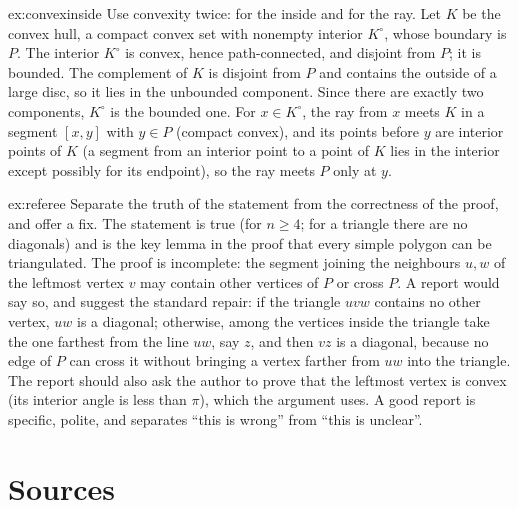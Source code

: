 \begin{solution}{ex:convexinside}
\idea Use convexity twice: for the inside and for the ray.
\writeup Let $K$ be the convex hull, a compact convex set with nonempty interior $K^\circ$, whose boundary is $P$. The interior $K^\circ$ is convex, hence path-connected, and disjoint from $P$; it is bounded. The complement of $K$ is disjoint from $P$ and contains the outside of a large disc, so it lies in the unbounded component. Since there are exactly two components, $K^\circ$ is the bounded one. For $x\in K^\circ$, the ray from $x$ meets $K$ in a segment $[x,y]$ with $y\in P$ (compact convex), and its points before $y$ are interior points of $K$ (a segment from an interior point to a point of $K$ lies in the interior except possibly for its endpoint), so the ray meets $P$ only at $y$.
\end{solution}

\begin{solution}{ex:referee}
\idea Separate the truth of the statement from the correctness of the proof, and offer a fix.
\writeup The statement is true (for $n\ge4$; for a triangle there are no diagonals) and is the key lemma in the proof that every simple polygon can be triangulated. The proof is incomplete: the segment joining the neighbours $u,w$ of the leftmost vertex $v$ may contain other vertices of $P$ or cross $P$. A report would say so, and suggest the standard repair: if the triangle $uvw$ contains no other vertex, $uw$ is a diagonal; otherwise, among the vertices inside the triangle take the one farthest from the line $uw$, say $z$, and then $vz$ is a diagonal, because no edge of $P$ can cross it without bringing a vertex farther from $uw$ into the triangle. The report should also ask the author to prove that the leftmost vertex is convex (its interior angle is less than $\pi$), which the argument uses. A good report is specific, polite, and separates ``this is wrong'' from ``this is unclear''.
\end{solution}

\section{Sources}

